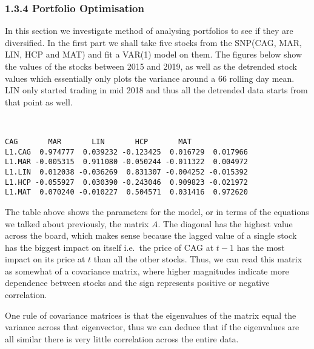 \documentclass[11pt]{article}
\begin{document}
\hypertarget{portfolio-optimisation}{%
\subsubsection{1.3.4 Portfolio
Optimisation}\label{portfolio-optimisation}}

In this section we investigate method of analysing portfolios to see if
they are diversified. In the first part we shall take five stocks from
the SNP(CAG, MAR, LIN, HCP and MAT) and fit a VAR(1) model on them. The
figures below show the values of the stocks between 2015 and 2019,
as well as the detrended stock values which essentially only plots the
variance around a 66 rolling day mean. LIN only started trading in mid
2018 and thus all the detrended data starts from that point as well.


    \begin{center}
    \end{center}
    { \hspace*{\fill} \\}
    
            \begin{tcolorbox}[breakable, size=fbox, boxrule=.5pt, pad at break*=1mm, opacityfill=0]
\begin{Verbatim}[commandchars=\\\{\}]
             CAG       MAR       LIN       HCP       MAT
L1.CAG  0.974777  0.039232 -0.123425  0.016729  0.017966
L1.MAR -0.005315  0.911080 -0.050244 -0.011322  0.004972
L1.LIN  0.012038 -0.036269  0.831307 -0.004252 -0.015392
L1.HCP -0.055927  0.030390 -0.243046  0.909823 -0.021972
L1.MAT  0.070240 -0.010227  0.504571  0.031416  0.972620
\end{Verbatim}
\end{tcolorbox}
        
    The table above shows the parameters for the model, or in terms of the
equations we talked about previously, the matrix \(A\). The diagonal has
the highest value across the board, which makes sense because the lagged
value of a single stock has the biggest impact on itself i.e.~the price
of CAG at \(t-1\) has the most impact on its price at \(t\) than all the other stocks. Thus, we can read this matrix as somewhat of a
covariance matrix, where higher magnitudes indicate more dependence
between stocks and the sign represents positive or negative correlation.

One rule of covariance matrices is that the eigenvalues of the matrix
equal the variance across that eigenvector, thus we can deduce that if
the eigenvalues are all similar there is very little correlation across
the entire data.
\end{document}
